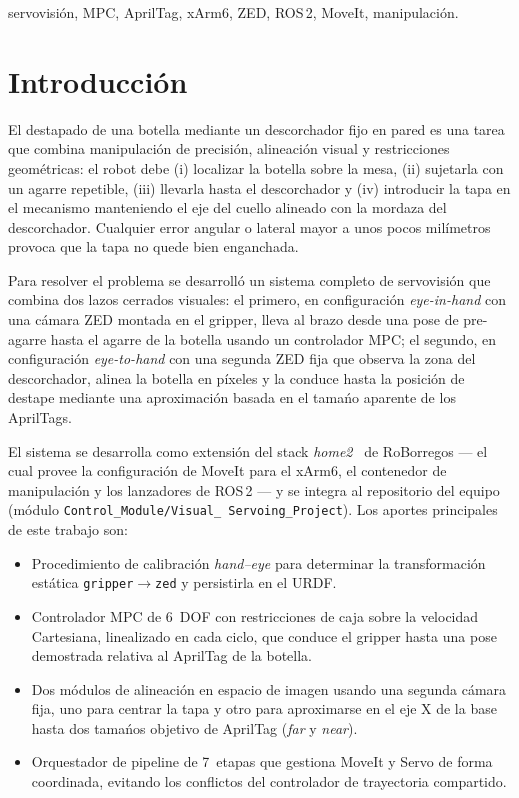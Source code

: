 \documentclass[conference]{IEEEtran}
\begin{document}
\begin{IEEEkeywords}
servovisi\'on, MPC, AprilTag, xArm6, ZED, ROS\,2, MoveIt, manipulaci\'on.
\end{IEEEkeywords}

\section{Introducci\'on}

El destapado de una botella mediante un descorchador fijo en pared es
una tarea que combina manipulaci\'on de precisi\'on, alineaci\'on
visual y restricciones geom\'etricas: el robot debe (i) localizar la
botella sobre la mesa, (ii) sujetarla con un agarre repetible,
(iii) llevarla hasta el descorchador y (iv) introducir la tapa en el
mecanismo manteniendo el eje del cuello alineado con la mordaza del
descorchador. Cualquier error angular o lateral mayor a unos pocos
mil\'imetros provoca que la tapa no quede bien enganchada.

Para resolver el problema se desarroll\'o un sistema completo de
servovisi\'on que combina dos lazos cerrados visuales: el primero, en
configuraci\'on \emph{eye-in-hand} con una c\'amara ZED montada en el
gripper, lleva al brazo desde una pose de pre-agarre hasta el agarre
de la botella usando un controlador MPC; el segundo, en
configuraci\'on \emph{eye-to-hand} con una segunda ZED fija que observa
la zona del descorchador, alinea la botella en p\'ixeles y la conduce
hasta la posici\'on de destape mediante una aproximaci\'on basada en
el tama\'no aparente de los AprilTags.

El sistema se desarrolla como extensi\'on del stack
\emph{home2}~\cite{roborregos-home2} de RoBorregos --- el cual provee
la configuraci\'on de MoveIt para el xArm6, el contenedor de
manipulaci\'on y los lanzadores de ROS\,2 --- y se integra al
repositorio del equipo (m\'odulo \texttt{Control\_Module/Visual\_%
Servoing\_Project}). Los aportes principales de este trabajo son:

\begin{itemize}
  \item Procedimiento de calibraci\'on \emph{hand--eye} para
        determinar la transformaci\'on est\'atica
        \texttt{gripper}$\rightarrow$\texttt{zed} y persistirla en el
        URDF.
  \item Controlador MPC de 6~DOF con restricciones de caja sobre la
        velocidad Cartesiana, linealizado en cada ciclo, que conduce
        el gripper hasta una pose demostrada relativa al AprilTag de
        la botella.
  \item Dos m\'odulos de alineaci\'on en espacio de imagen usando una
        segunda c\'amara fija, uno para centrar la tapa y otro para
        aproximarse en el eje X de la base hasta dos tama\'nos
        objetivo de AprilTag (\emph{far} y \emph{near}).
  \item Orquestador de pipeline de 7~etapas que gestiona MoveIt y
        Servo de forma coordinada, evitando los conflictos del
        controlador de trayectoria compartido.
\end{itemize}
\end{document}
